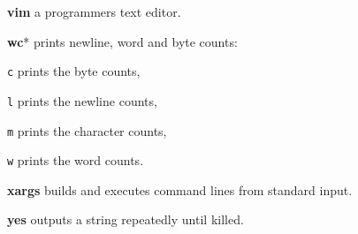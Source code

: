 \textbf{vim} a programmers text editor.

\textbf{wc}* prints newline, word and byte counts:
\begin{enumx}
	\item [\texttt{c}] prints the byte counts,
	\item [\texttt{l}] prints the newline counts,
	\item [\texttt{m}] prints the character counts,
	\item [\texttt{w}] prints the word counts.
\end{enumx}

\textbf{xargs} builds and executes command lines from standard input.

\textbf{yes} outputs a string repeatedly until killed.
